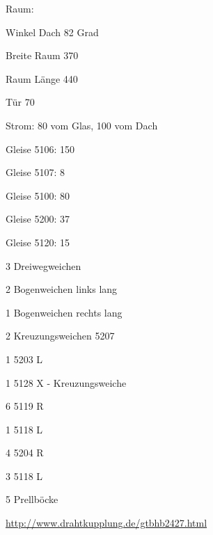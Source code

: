 \documentclass{article}
\begin{document}
\newpage
\makeatletter

\TrackUse

\newpage

Raum: 

Winkel Dach 82 Grad

Breite Raum 370

Raum Länge 440

Tür 70

Strom: 80 vom Glas, 100 vom Dach

Gleise 5106: 150

Gleise 5107: 8 

Gleise 5100: 80

Gleise 5200: 37

Gleise 5120: 15

3 Dreiwegweichen

2 Bogenweichen links lang

1 Bogenweichen rechts lang

2 Kreuzungsweichen 5207

1 5203 L

1 5128 X - Kreuzungsweiche

6 5119 R

1 5118 L

4 5204 R

3 5118 L

5 Prellböcke

\url{http://www.drahtkupplung.de/gtbhb2427.html}

\newpage
% 
% 
% 
\newpage
{}
\end{document}
